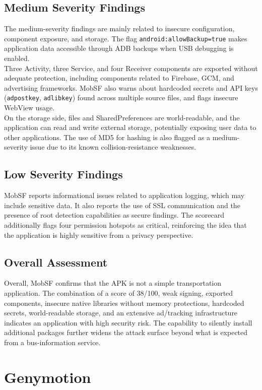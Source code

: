 \subsection{Medium Severity Findings}
The medium-severity findings are mainly related to insecure configuration, component exposure, and storage. The flag \texttt{android:allowBackup=true} makes application data accessible through ADB backups when USB debugging is enabled.\\
Three Activity, three Service, and four Receiver components are exported without adequate protection, including components related to Firebase, GCM, and advertising frameworks. MobSF also warns about hardcoded secrets and API keys (\texttt{adpostkey}, \texttt{adlibkey}) found across multiple source files, and flags insecure WebView usage.\\
On the storage side, files and SharedPreferences are world-readable, and the application can read and write external storage, potentially exposing user data to other applications. The use of MD5 for hashing is also flagged as a medium-severity issue due to its known collision-resistance weaknesses.

\subsection{Low Severity Findings}
MobSF reports informational issues related to application logging, which may include sensitive data. It also reports the use of SSL communication and the presence of root detection capabilities as secure findings. The scorecard additionally flags four permission hotspots as critical, reinforcing the idea that the application is highly sensitive from a privacy perspective.

\subsection{Overall Assessment}
Overall, MobSF confirms that the APK is not a simple transportation application. The combination of a score of 38/100, weak signing, exported components, insecure native libraries without memory protections, hardcoded secrets, world-readable storage, and an extensive ad/tracking infrastructure indicates an application with high security risk. The capability to silently install additional packages further widens the attack surface beyond what is expected from a bus-information service.

\section{Genymotion}

